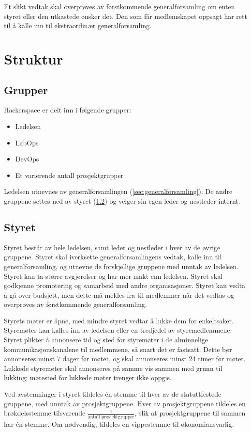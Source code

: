 Et slikt vedtak skal overprøves av førstkommende generalforsamling om enten styret eller den utkastede ønsker det. Den som får medlemskapet oppsagt har rett til å kalle inn til ekstraordinær generalforsamling.


\section{Struktur}\label{sec:struktur}
\subsection{Grupper}\label{sec:struktur:grupper}
Hackerspace er delt inn i følgende grupper:
\begin{itemize}
\item Ledelsen
\item LabOps
\item DevOps
\item Et varierende antall prosjektgrupper
\end{itemize}
Ledelsen utnevnes av generalforsamlingen (\ref{sec:generalforsamling}). De andre gruppene settes ned av styret (\ref{sec:struktur:styret}) og velger sin egen leder og nestleder internt.

\subsection{Styret}\label{sec:struktur:styret}
Styret består av hele ledelsen, samt leder og nestleder i hver av de øvrige gruppene.
Styret skal iverksette generalforsamlingens vedtak, kalle inn til generalforsamling, og utnevne de forskjellige gruppene med unntak av ledelsen.
Styret kan ta større avgjørelser og har mer makt enn ledelsen.
Styret skal godkjenne promotering og samarbeid med andre organisasjoner.
Styret kan vedta å gå over budsjett, men dette må meldes fra til medlemmer når det vedtas og overprøves av førstkommende generalforsamling.

Styrets møter er åpne, med mindre styret vedtar å lukke dem for enkeltsaker.
Styremøter kan kalles inn av ledelsen eller en tredjedel av styremedlemmene.
Styret plikter å annonsere tid og sted for styremøter i de alminnelige kommunikasjonskanalene til medlemmene, så snart det er fastsatt.
Dette bør annonseres minst 7 dager før møtet, og skal annonseres minst 24 timer før møtet.
Lukkede styremøter skal annonseres på samme vis sammen med grunn til lukking; møtested for lukkede møter trenger ikke oppgis.

Ved avstemninger i styret tildeles én stemme til hver av de statuttfestede gruppene, med unntak av prosjektgruppene.
Hver av prosjektgruppene tildeles en brøkdelsstemme tilsvarende $\frac{1}{\text{antall prosjektgrupper}}$, slik at prosjektgruppene til sammen har én stemme.
Om nødvendig, tildeles én vippestemme til økonomiansvarlig.

